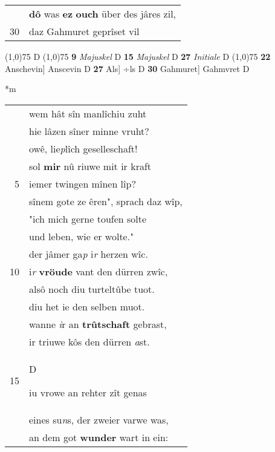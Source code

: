 \documentclass[8pt,a4paper,notitlepage]{article}
\begin{document}
\begin{table}[ht]
\begin{minipage}[t]{0.5\linewidth}
\begin{tabular}{rl}
 & \textbf{dô} was \textbf{ez} \textbf{ouch} über des jâres zil,\\ 
30 & daz Gahmuret geprîset vil\\ 
\end{tabular}
\scriptsize
\line(1,0){75} \newline
D \newline
\line(1,0){75} \newline
\textbf{9} \textit{Majuskel} D  \textbf{15} \textit{Majuskel} D  \textbf{27} \textit{Initiale} D  \newline
\line(1,0){75} \newline
\textbf{22} Anschevin] Anscevin D \textbf{27} Als] ÷ls D \textbf{30} Gahmuret] Gahmvret D \newline
\end{minipage}
\hspace{0.5cm}
\begin{minipage}[t]{0.5\linewidth}
\small
\begin{center}*m
\end{center}
\begin{tabular}{rl}
 & wem hât sîn manlîchiu zuht\\ 
 & hie lâzen sîner minne vruht?\\ 
 & owê, lie\textit{p}lîch geselleschaft!\\ 
 & sol \textbf{mir} nû riuwe mit ir kraft\\ 
5 & iemer twingen mînen lîp?\\ 
 & sînem gote ze êren", sprach daz wîp,\\ 
 & "ich mich gerne toufen solte\\ 
 & und leben, wie er wolte."\\ 
 & der jâmer ga\textit{p} i\textit{r} herzen wîc.\\ 
10 & i\textit{r} \textbf{vröude} vant den dürren zwîc,\\ 
 & alsô noch diu turteltûbe tuot.\\ 
 & diu het ie den selben muot.\\ 
 & wanne \textit{i}r an \textbf{trûtschaft} gebrast,\\ 
 & ir triuwe kôs den dürren \textit{a}st.\\ 
15 & \begin{large}D\end{large}iu vrowe an rehter zît genas\\ 
 & eines su\textit{n}s, der zweier varwe was,\\ 
 & an dem got \textbf{wunder} wart in ein:\\ 

\end{tabular}
\end{minipage}
\end{table}
\end{document}
